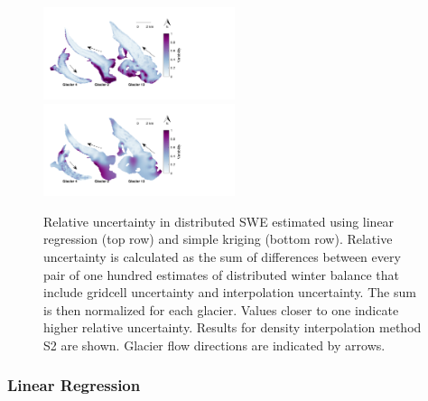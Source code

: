 \documentclass[twocolumn, letterpaper]{igs}
\begin{document}
\begin{figure}
	\centering
	\includegraphics[width =0.5\textwidth]{SpatialVar_LR.pdf}\\
	\includegraphics[width =0.5\textwidth]{SpatialVar_SK.pdf}\\
	\caption{Relative uncertainty in distributed SWE estimated using linear regression (top row) and simple kriging (bottom row). Relative uncertainty is calculated as the sum of differences between every pair of one hundred estimates of distributed winter balance that include gridcell uncertainty and interpolation uncertainty. The sum is then normalized for each glacier. Values closer to one indicate higher relative uncertainty. Results for density interpolation method S2 are shown. Glacier flow directions are indicated by arrows.}
	\label{fig:WSMBspatialvar}
\end{figure}

\subsubsection{Linear Regression}
\end{document}
